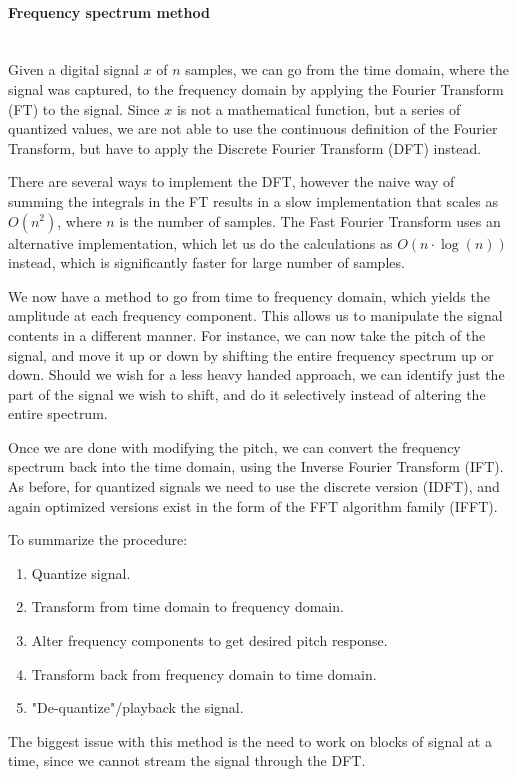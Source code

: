 \paragraph{Frequency spectrum method}\mbox{}\\
Given a digital signal $x$ of $n$ samples, we can go from the time domain, where the signal was captured, to the frequency domain by applying the Fourier Transform (FT) to the signal. Since $x$ is not a mathematical function, but a series of quantized values, we are not able to use the continuous definition of the Fourier Transform, but have to apply the Discrete Fourier Transform (DFT) instead.

There are several ways to implement the DFT, however the naive way of summing the integrals in the FT results in a slow implementation that scales as $O(n^{2})$, where $n$ is the number of samples. The Fast Fourier Transform uses an alternative implementation, which let us do the calculations as $O(n \cdot \log(n))$ instead, which is significantly faster for large number of samples. 

We now have a method to go from time to frequency domain, which yields the amplitude at each frequency component. This allows us to manipulate the signal contents in a different manner. For instance, we can now take the pitch of the signal, and move it up or down by shifting the entire frequency spectrum up or down. Should we wish for a less heavy handed approach, we can identify just the part of the signal we wish to shift, and do it selectively instead of altering the entire spectrum.

Once we are done with modifying the pitch, we can convert the frequency spectrum back into the time domain, using the Inverse Fourier Transform (IFT). As before, for quantized signals we need to use the discrete version (IDFT), and again optimized versions exist in the form of the FFT algorithm family (IFFT).

To summarize the procedure:
\begin{enumerate}
	\item Quantize signal.
	\item Transform from time domain to frequency domain.
	\item Alter frequency components to get desired pitch response.
	\item Transform back from frequency domain to time domain.
	\item "De-quantize"/playback the signal.
\end{enumerate}
The biggest issue with this method is the need to work on blocks of signal at a time, since we cannot stream the signal through the DFT.

